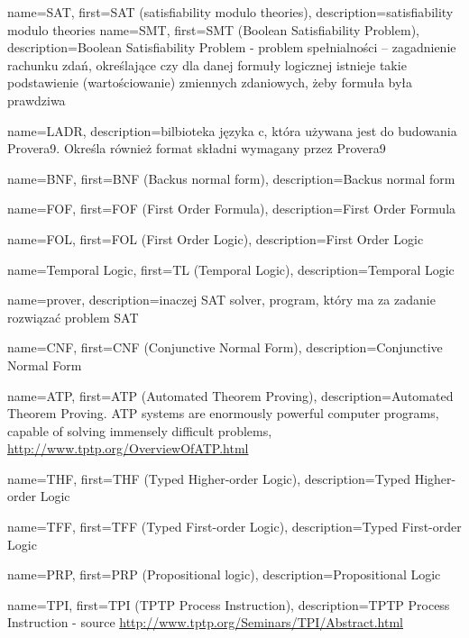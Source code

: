 
 {
    name=SAT,
    first={SAT (satisfiability modulo theories)},
    description={satisfiability modulo theories}
}
 {
    name=SMT,
    first={SMT (Boolean Satisfiability Problem)},
    description={Boolean Satisfiability Problem - problem spełnialności – zagadnienie rachunku zdań, określające czy dla danej formuły logicznej istnieje takie podstawienie (wartościowanie) zmiennych zdaniowych, żeby formuła była prawdziwa}
}

 {
    name=LADR,
    description={bilbioteka języka c, która używana jest do budowania Provera9. Określa również format składni wymagany przez Provera9}
}

 {
    name=BNF,
    first={BNF (Backus normal form)},
    description={Backus normal form}
}

 {
    name=FOF,
    first={FOF (First Order Formula)},
    description={First Order Formula}
}

 {
    name=FOL,
    first={FOL (First Order Logic)},
    description={First Order Logic}
}

 {
    name={Temporal Logic},
    first={TL (Temporal Logic)},
    description={Temporal Logic}
}

 {
    name=prover,
    description={inaczej SAT solver, program, który ma za zadanie rozwiązać problem SAT}
}

 {
    name=CNF,
    first={CNF (Conjunctive Normal Form)},
    description={Conjunctive Normal Form}
}

 {
    name=ATP,
    first={ATP (Automated Theorem Proving)},
    description={Automated Theorem Proving. ATP systems are enormously powerful computer programs, capable of solving immensely difficult problems, \url{http://www.tptp.org/OverviewOfATP.html}}
}

 {
    name=THF,
    first={THF (Typed Higher-order Logic)},
    description={Typed Higher-order Logic}
}

 {
    name=TFF,
    first={TFF (Typed First-order Logic)},
    description={Typed First-order Logic}
}

 {
    name={PRP},
    first={PRP (Propositional logic)},
    description={Propositional Logic}
}

 {
    name=TPI,
    first={TPI (TPTP Process Instruction)},
    description={TPTP Process Instruction - source \url{http://www.tptp.org/Seminars/TPI/Abstract.html}}
}

